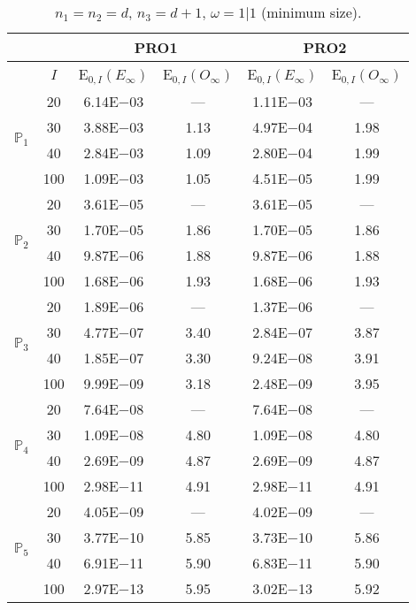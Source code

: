 \begin{table}[H]
\caption{$n_1=n_2=d$, $n_3=d+1$, $\omega=1|1$ (minimum size).}
\setlength{\tabcolsep}{5pt}
\centering
\begin{tabular}{@{}l c c c c c@{}}
\toprule
 &  & \multicolumn{2}{c}{PRO1} & \multicolumn{2}{c}{PRO2}\\
\midrule
 & $I$ & E$_{0,I}(E_{\infty})$ & E$_{0,I}(O_{\infty})$ & E$_{0,I}(E_{\infty})$ & E$_{0,I}(O_{\infty})$\\
\midrule
\multirow{4}{*}{$\mathbb{P}_{1}$}
 & 20 & 6.14E$-$03 & --- & 1.11E$-$03 & ---\\
 & 30 & 3.88E$-$03 & 1.13 & 4.97E$-$04 & 1.98 \\
 & 40 & 2.84E$-$03 & 1.09 & 2.80E$-$04 & 1.99 \\
 & 100 & 1.09E$-$03 & 1.05 & 4.51E$-$05 & 1.99 \\
\midrule
\multirow{4}{*}{$\mathbb{P}_{2}$}
 & 20 & 3.61E$-$05 & --- & 3.61E$-$05 & ---\\
 & 30 & 1.70E$-$05 & 1.86 & 1.70E$-$05 & 1.86 \\
 & 40 & 9.87E$-$06 & 1.88 & 9.87E$-$06 & 1.88 \\
 & 100 & 1.68E$-$06 & 1.93 & 1.68E$-$06 & 1.93 \\
\midrule
\multirow{4}{*}{$\mathbb{P}_{3}$}
 & 20 & 1.89E$-$06 & --- & 1.37E$-$06 & ---\\
 & 30 & 4.77E$-$07 & 3.40 & 2.84E$-$07 & 3.87 \\
 & 40 & 1.85E$-$07 & 3.30 & 9.24E$-$08 & 3.91 \\
 & 100 & 9.99E$-$09 & 3.18 & 2.48E$-$09 & 3.95 \\
\midrule
\multirow{4}{*}{$\mathbb{P}_{4}$}
 & 20 & 7.64E$-$08 & --- & 7.64E$-$08 & ---\\
 & 30 & 1.09E$-$08 & 4.80 & 1.09E$-$08 & 4.80 \\
 & 40 & 2.69E$-$09 & 4.87 & 2.69E$-$09 & 4.87 \\
 & 100 & 2.98E$-$11 & 4.91 & 2.98E$-$11 & 4.91 \\
\midrule
\multirow{4}{*}{$\mathbb{P}_{5}$}
 & 20 & 4.05E$-$09 & --- & 4.02E$-$09 & ---\\
 & 30 & 3.77E$-$10 & 5.85 & 3.73E$-$10 & 5.86 \\
 & 40 & 6.91E$-$11 & 5.90 & 6.83E$-$11 & 5.90 \\
 & 100 & 2.97E$-$13 & 5.95 & 3.02E$-$13 & 5.92 \\
\bottomrule
\end{tabular}
\label{Table:PRO:Rodrigo:Test7}
\end{table}
